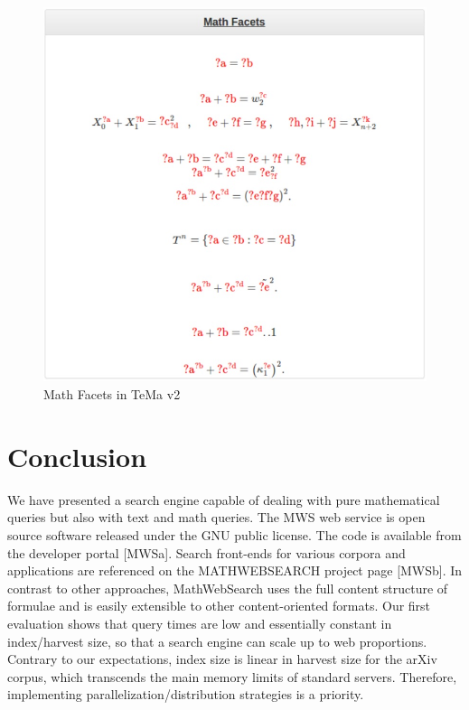 \documentclass{deliverablereport}
\begin{document}
\begin{figure}[H]
\centering
 \includegraphics[scale=0.8]{figure10.jpg}
 \caption{Math Facets in TeMa v2}
\end{figure}

\section{Conclusion}\label{sec:concl}
We have presented a search engine capable of dealing with pure mathematical queries but also with text and math queries. The MWS web service is open source software released under the GNU public license. The code is available from the developer portal [MWSa]. Search front-ends for various corpora and applications are referenced on the MATHWEBSEARCH project page [MWSb]. In contrast to other approaches, MathWebSearch uses the full content
structure of formulae and is easily extensible to other content-oriented formats. Our first evaluation shows that query times are low and essentially constant in index/harvest size, so that a search engine can scale up to web proportions. Contrary to our expectations, index size is linear in harvest size for the arXiv corpus, which transcends the main memory limits of standard servers. Therefore, implementing parallelization/distribution strategies is a priority. \par
\end{document}
